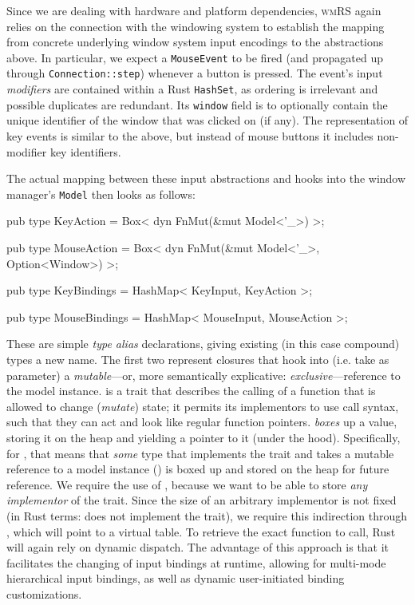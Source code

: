 Since we are dealing with hardware and platform dependencies, \textsc{wmRS}
again relies on the connection with the windowing system to establish the
mapping from concrete underlying window system input encodings to the
abstractions above. In particular, we expect a \texttt{MouseEvent} to be
fired (and propagated up through \texttt{Connection::step}) whenever a
button is pressed. The event's input \textit{modifiers} are contained within
a Rust \texttt{HashSet}, as ordering is irrelevant and possible duplicates
are redundant. Its \texttt{window} field is to optionally contain the unique
identifier of the window that was clicked on (if any). The representation of
key events is similar to the above, but instead of mouse buttons it includes
non-modifier key identifiers.

The actual mapping between these input abstractions and hooks into the window
manager's \texttt{Model} then looks as follows:

\begin{rustblock}
  pub type KeyAction = Box<
    dyn FnMut(&mut Model<'_>)
  >;
\end{rustblock}
\begin{rustblock}
  pub type MouseAction = Box<
    dyn FnMut(&mut Model<'_>, Option<Window>)
  >;
\end{rustblock}
\begin{rustblock}
  pub type KeyBindings = HashMap<
    KeyInput, KeyAction
  >;
\end{rustblock}
\begin{rustblock}
  pub type MouseBindings = HashMap<
    MouseInput, MouseAction
  >;
\end{rustblock}

These are simple \textit{type alias} declarations, giving existing (in this case
compound) types a new name. The first two represent closures that hook into
(i.e. take as parameter) a \textit{mutable}---or, more semantically explicative:
\textit{exclusive}---reference to the model instance\cite{therustbook}.
 is a trait that describes the calling of a function that is
allowed to change (\textit{mutate}) state; it permits its implementors to use
call syntax, such that they can act and look like regular function pointers.
 \textit{boxes} up a value, storing it on the heap and yielding
a pointer to it (under the hood). Specifically, for , that
means that \textit{some} type that implements the  trait and takes
a mutable reference to a model instance ()
is boxed up and stored on the heap for future reference. We require the use
of , because we want to be able to store \textit{any implementor}
of the  trait. Since the size of an arbitrary implementor is
not fixed (in Rust terms:  does not implement the 
trait), we require this indirection through , which will point to a
virtual table. To retrieve the exact function to call, Rust will again rely
on dynamic dispatch\cite{rustclosureshard}. The advantage of this approach
is that it facilitates the changing of input bindings at runtime, allowing
for multi-mode hierarchical input bindings, as well as dynamic user-initiated
binding customizations.

